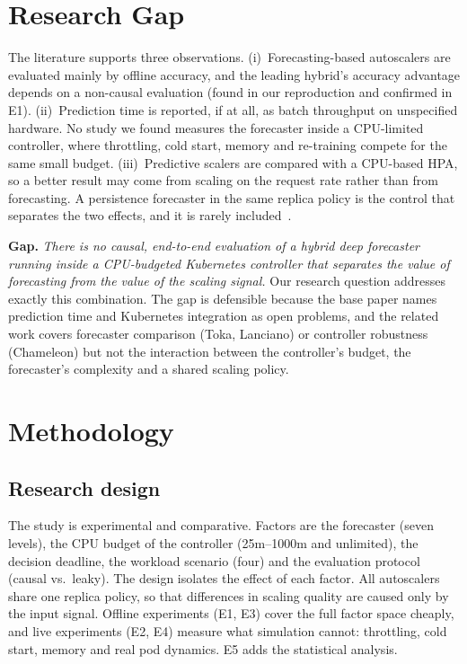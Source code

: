 \documentclass[conference,a4paper]{IEEEtran}
\begin{document}
\section{Research Gap}\label{sec:gap}
The literature supports three observations. (i)~Forecasting-based autoscalers are evaluated mainly by offline
accuracy, and the leading hybrid's accuracy advantage depends on a non-causal evaluation (found in our
reproduction and confirmed in E1). (ii)~Prediction time is reported, if at all, as batch throughput on unspecified
hardware. No study we found measures the forecaster inside a CPU-limited controller, where throttling, cold start,
memory and re-training compete for the same small budget. (iii)~Predictive scalers are compared with a CPU-based
HPA, so a better result may come from scaling on the request rate rather than from forecasting. A persistence
forecaster in the same replica policy is the control that separates the two effects, and it is rarely
included~\cite{makridakis2018,kapoor2023,hyndman2006}.

\textbf{Gap.} \emph{There is no causal, end-to-end evaluation of a hybrid deep forecaster running inside a
CPU-budgeted Kubernetes controller that separates the value of forecasting from the value of the scaling signal.}
Our research question addresses exactly this combination. The gap is defensible because the base paper names
prediction time and Kubernetes integration as open problems, and the related work covers forecaster comparison
(Toka, Lanciano) or controller robustness (Chameleon) but not the interaction between the controller's budget,
the forecaster's complexity and a shared scaling policy.

\section{Methodology}\label{sec:method}
\subsection{Research design}
The study is experimental and comparative. Factors are the forecaster (seven levels), the CPU budget of the
controller (25m--1000m and unlimited), the decision deadline, the workload scenario (four) and the evaluation
protocol (causal vs.\ leaky). The design isolates the effect of each factor. All autoscalers share one replica
policy, so that differences in scaling quality are caused only by the input signal. Offline experiments (E1, E3)
cover the full factor space cheaply, and live experiments (E2, E4) measure what simulation cannot: throttling,
cold start, memory and real pod dynamics. E5 adds the statistical analysis.
\end{document}
